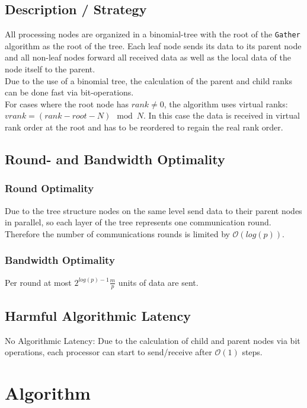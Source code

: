 \subsection{Description / Strategy}

All processing nodes are organized in a binomial-tree with the root of the \texttt{Gather} algorithm as the root of the tree. Each leaf node sends its data to its parent node and all non-leaf nodes forward all received data as well as the local data of the node itself to the parent. \\
Due to the use of a binomial tree, the calculation of the parent and child ranks can be done fast via bit-operations.\\

\noindent For cases where the root node has $rank \neq 0$, the algorithm uses virtual ranks:
$vrank = (rank - root - N ) \mod N$. In this case the data is received in virtual rank order at the root and has to be reordered to regain the real rank order.

\subsection{Round- and Bandwidth Optimality}

\subsubsection{Round Optimality}
Due to the tree structure nodes on the same level send data to their parent nodes in parallel, so each layer of the tree represents one communication round. Therefore the number of communications rounds is limited by $\mathcal{O}(log(p))$.

\subsubsection{Bandwidth Optimality}
Per round at most $2^{log(p)-1} \frac{m}{p}$ units of data are sent. %

\subsection{Harmful Algorithmic Latency}
No Algorithmic Latency: Due to the calculation of child and parent nodes via bit operations, each processor can start to send/receive after $\mathcal{O}(1)$ steps.


\section{Algorithm \myscatter}

